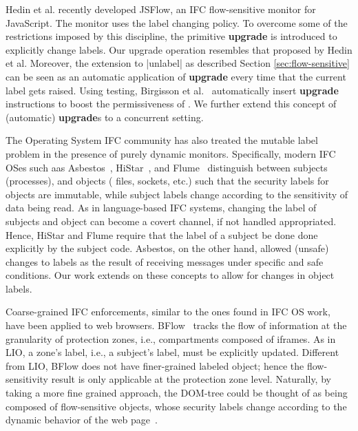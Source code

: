 Hedin et al. \citep{Hedin13} recently developed JSFlow, an IFC flow-sensitive
monitor for JavaScript. The monitor uses the {\nsu} label changing
policy. To overcome some of the restrictions imposed by this discipline, the
primitive \textbf{upgrade} is introduced to explicitly change labels. Our
upgrade operation resembles that proposed by Hedin et al. Moreover, the
extension to |unlabel| as described Section \ref{sec:flow-sensitive} can be seen as an
automatic application of \textbf{upgrade} every time that the current label gets
raised. Using testing, Birgisson et al.~\citep{Arnar2012} automatically insert
\textbf{upgrade} instructions to boost the permissiveness of {\nsu}.
We further extend this concept of (automatic) \textbf{upgrade}s to a concurrent setting.


The Operating System IFC community has also treated the mutable label
problem in the presence of purely dynamic monitors.
%
Specifically, modern IFC OSes such aas
Asbestos~\cite{Efstathopoulos:2005}, HiStar~\cite{zeldovich:histar},
and Flume~\cite{hkrohn:flume} distinguish between subjects
(processes), and objects ( files, sockets, etc.) such that the
security labels for objects are immutable, while subject labels change
according to the sensitivity of data being read.
%
As in language-based IFC systems, changing the label of subjects and
object can become a covert channel, if not handled appropriated.
%
Hence, HiStar and Flume require that the label of a subject be done
done explicitly by the subject code.
%
Asbestos, on the other hand, allowed (unsafe) changes to labels as the result
of receiving messages under specific and safe conditions.
%
Our work extends on these concepts to allow for changes in object
labels.

Coarse-grained IFC enforcements, similar to the ones found in IFC OS
work, have been applied to web browsers. BFlow~\citep{Yip:2009} tracks
the flow of information at the granularity of protection zones, i.e.,
compartments composed of iframes. As in LIO, a zone's label, i.e., a
subject's label, must be explicitly updated. Different from LIO, BFlow
does not have finer-grained labeled object; hence the flow-sensitivity
result is only applicable at the protection zone level.  Naturally, by
taking a more fine grained approach, the DOM-tree could be thought of
as being composed of flow-sensitive objects, whose security
labels change according to the dynamic behavior of the web
page~\citep{Russo:2009}.

